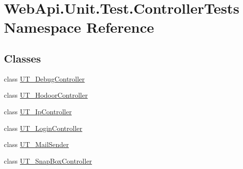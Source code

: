\hypertarget{namespace_web_api_1_1_unit_1_1_test_1_1_controller_tests}{}\section{Web\+Api.\+Unit.\+Test.\+Controller\+Tests Namespace Reference}
\label{namespace_web_api_1_1_unit_1_1_test_1_1_controller_tests}
\subsection*{Classes}
\begin{DoxyCompactItemize}
\item 
class \mbox{\hyperlink{class_web_api_1_1_unit_1_1_test_1_1_controller_tests_1_1_u_t___debug_controller}{U\+T\+\_\+\+Debug\+Controller}}
\item 
class \mbox{\hyperlink{class_web_api_1_1_unit_1_1_test_1_1_controller_tests_1_1_u_t___hodoor_controller}{U\+T\+\_\+\+Hodoor\+Controller}}
\item 
class \mbox{\hyperlink{class_web_api_1_1_unit_1_1_test_1_1_controller_tests_1_1_u_t___ip_controller}{U\+T\+\_\+\+Ip\+Controller}}
\item 
class \mbox{\hyperlink{class_web_api_1_1_unit_1_1_test_1_1_controller_tests_1_1_u_t___login_controller}{U\+T\+\_\+\+Login\+Controller}}
\item 
class \mbox{\hyperlink{class_web_api_1_1_unit_1_1_test_1_1_controller_tests_1_1_u_t___mail_sender}{U\+T\+\_\+\+Mail\+Sender}}
\item 
class \mbox{\hyperlink{class_web_api_1_1_unit_1_1_test_1_1_controller_tests_1_1_u_t___snap_box_controller}{U\+T\+\_\+\+Snap\+Box\+Controller}}
\end{DoxyCompactItemize}
